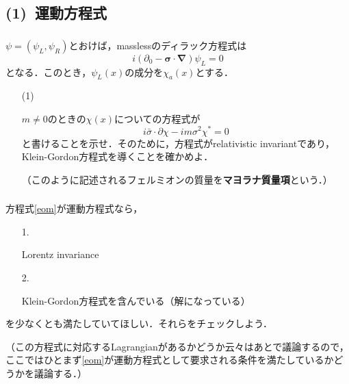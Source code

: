 \documentclass[pdflatex,unicode,ja=standard,12pt]{beamer}
\begin{document}
\subsection{(1)\ 運動方程式}

\begin{frame}

  \frametitle{\subsecname}

  $\psi=(\psi_L,\psi_R)$とおけば，masslessのディラック方程式は
  \begin{equation}
    i(\partial_0-\bm{\sigma}\cdot\bm{\nabla})\psi_L=0
  \end{equation}
  となる．このとき，$\psi_L(x)$の成分を$\chi_a(x)$とする．

  \vspace{10pt}

  \begin{itemize}

    \item [(1)]
    
    $m\neq 0$のときの$\chi(x)$についての方程式が
    \begin{equation}
      i\bar{\sigma}\cdot\partial\chi
      -
      im\sigma^2\chi^{*}
      =
      0
      \label{eom}
    \end{equation}
    と書けることを示せ．そのために，方程式がrelativistic invariantであり，Klein-Gordon方程式を導くことを確かめよ．

    \vspace{10pt}

    （このように記述されるフェルミオンの質量を\textbf{マヨラナ質量項}という．）

  \end{itemize}

\end{frame}

\begin{frame}
  
  \frametitle{\subsecname}

  方程式\eqref{eom}が運動方程式なら，
  \begin{itemize}
    \item [1.]
    
    Lorentz invariance

    \item [2.]

    Klein-Gordon方程式を含んでいる（解になっている）

  \end{itemize}
  を少なくとも満たしていてほしい．それらをチェックしよう．

  \vspace{10pt}
  
  （この方程式に対応するLagrangianがあるかどうか云々はあとで議論するので，ここではひとまず\eqref{eom}が運動方程式として要求される条件を満たしているかどうかを議論する．）

\end{frame}
\end{document}
